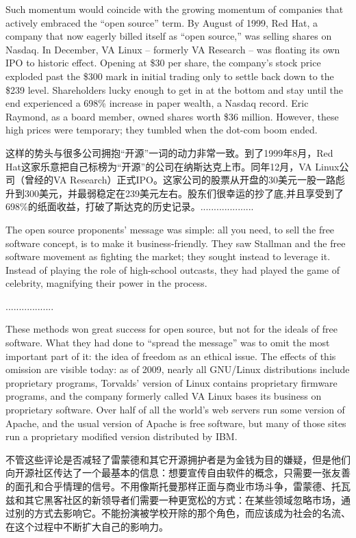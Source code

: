 \ifdefined\eng
Such momentum would coincide with the growing momentum of companies that actively embraced the ``open source'' term. By August of 1999, Red Hat, a company that now eagerly billed itself as ``open source,'' was selling shares on Nasdaq. In December, VA Linux -- formerly VA Research -- was floating its own IPO to historic effect. Opening at \$30 per share, the company's stock price exploded past the \$300 mark in initial trading only to settle back down to the \$239 level. Shareholders lucky enough to get in at the bottom and stay until the end experienced a 698\% increase in paper wealth, a Nasdaq record.  Eric Raymond, as a board member, owned shares worth \$36 million.  However, these high prices were temporary; they tumbled when the dot-com boom ended.
\fi

\ifdefined\chs
这样的势头与很多公司拥抱“开源”一词的动力非常一致。到了1999年8月，Red Hat这家乐意把自己标榜为“开源”的公司在纳斯达克上市。同年12月，VA Linux公司（曾经的VA Research）正式IPO。这家公司的股票从开盘的30美元一股一路彪升到300美元，并最弱稳定在239美元左右。股东们很幸运的抄了底,并且享受到了698\%的纸面收益，打破了斯达克的历史记录。....................
\fi

\ifdefined\eng
The open source proponents' message was simple: all you need, to sell the free software concept, is to make it business-friendly.  They saw Stallman and the free software movement as fighting the market; they sought instead to leverage it. Instead of playing the role of high-school outcasts, they had played the game of celebrity, magnifying their power in the process.
\fi

\ifdefined\chs
..................
\fi

\ifdefined\eng
These methods won great success for open source, but not for the ideals of free software.  What they had done to ``spread the message'' was to omit the most important part of it: the idea of freedom as an ethical issue.  The effects of this omission are visible today: as of 2009, nearly all GNU/Linux distributions include proprietary programs, Torvalds' version of Linux contains proprietary firmware programs, and the company formerly called VA Linux bases its business on proprietary software.  Over half of all the world's web servers run some version of Apache, and the usual version of Apache is free software, but many of those sites run a proprietary modified version distributed by IBM.
\fi

\ifdefined\chs
不管这些评论是否减轻了雷蒙德和其它开源拥护者是为金钱为目的嫌疑，但是他们向开源社区传达了一个最基本的信息：想要宣传自由软件的概念，只需要一张友善的面孔和合乎情理的信号。不用像斯托曼那样正面与商业市场斗争，雷蒙德、托瓦兹和其它黑客社区的新领导者们需要一种更宽松的方式：在某些领域忽略市场，通过别的方式去影响它。不能扮演被学校开除的那个角色，而应该成为社会的名流、在这个过程中不断扩大自己的影响力。
\fi


